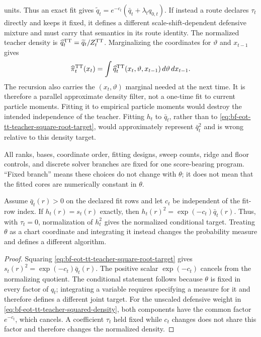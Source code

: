 units.  Thus an exact fit gives
\(\widetilde q_t=e^{-c_t}(\bar q_t+\lambda_tq_{0,t})\).  If instead a route
declares \(\tau_t\) directly and keeps it fixed, it defines a different
scale-shift-dependent defensive mixture and must carry that semantics in its
route identity.  The normalized teacher density is
\(\widehat q_t^{\rm TT}=\widetilde q_t/Z_t^{\rm TT}\).  Marginalizing the
coordinates for \(\vartheta\) and \(x_{t-1}\) gives
\begin{equation}
 \widehat\pi_t^{\rm TT}(x_t)
 =\int\widehat q_t^{\rm TT}(x_t,\vartheta,x_{t-1})
       \,d\vartheta\,dx_{t-1}.
 \label{eq:bf-eot-tt-teacher-filter-marginal}
\end{equation}
The recursion also carries the \((x_t,\vartheta)\) marginal needed at the next
time.  It is therefore a parallel approximate density filter, not a one-time
fit to current particle moments.  Fitting it to empirical particle moments
 would destroy the intended independence of the teacher.  Fitting \(h_t\) to
 \(\bar q_t\), rather than to
 \eqref{eq:bf-eot-tt-teacher-square-root-target}, would approximately represent
 \(\bar q_t^2\) and is wrong relative to this density target.

All ranks, bases, coordinate order, fitting designs, sweep counts, ridge and
floor controls, and discrete solver branches are fixed for one score-bearing
program.  ``Fixed branch'' means these choices do not change with \(\theta\);
 it does not mean that the fitted cores are numerically constant in \(\theta\).

\begin{proposition}
\label{prop:bf-eot-tt-teacher-square-root-target}
Assume \(\bar q_t(r)>0\) on the declared fit rows and let \(c_t\) be independent
of the fit-row index.  If \(h_t(r)=s_t(r)\) exactly, then
\(h_t(r)^2=\exp(-c_t)\bar q_t(r)\).  Thus, with \(\tau_t=0\), normalization
of \(h_t^2\) gives the normalized conditional target.  Treating \(\theta\) as
a chart coordinate and integrating it instead changes the probability measure
and defines a different algorithm.
\end{proposition}

\begin{proof}
Squaring \eqref{eq:bf-eot-tt-teacher-square-root-target} gives
\(s_t(r)^2=\exp(-c_t)\bar q_t(r)\).  The positive scalar
\(\exp(-c_t)\) cancels from the normalizing quotient.  The conditional
statement follows because \(\theta\) is fixed in every factor of \(q_t\);
integrating a variable requires specifying a measure for it and therefore
defines a different joint target.  For the unscaled defensive weight in
\eqref{eq:bf-eot-tt-teacher-squared-density}, both components have the common
factor \(e^{-c_t}\), which cancels.  A coefficient \(\tau_t\) held fixed while
\(c_t\) changes does not share this factor and therefore changes the
normalized density.
\end{proof}

